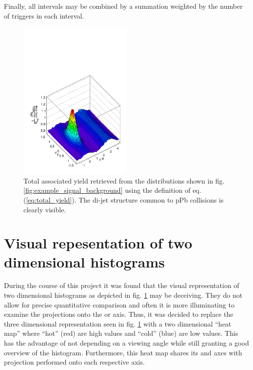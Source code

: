 Finally, all \zvtx intervals may be combined by a summation weighted by the number of triggers in each interval.

\begin{figure}
  \centering
  \includegraphics[width=0.5\textwidth]{figures/example_y.pdf}
  \caption[Total associated yield \Y retrieved from the distributions shown in fig. \ref{fig:example_signal_background} using the definition of eq. (\ref{eq:total_yield}).]{Total associated yield \Y retrieved from the distributions shown in fig. \ref{fig:example_signal_background} using the definition of eq. (\ref{eq:total_yield}). The di-jet structure common to \gls{pPb} collisions is clearly visible.}
  \label{fig:example_y}
\end{figure}

\section{Visual repesentation of two dimensional histograms}
\label{sec:multi_plot_expl}
During the course of this project it was found that the visual representation of two dimensional histograms as depicted in fig. \ref{fig:example_y} may be deceiving. They do not allow for precise quantitative comparison and often it is more illuminating to examine the projections onto the \deta or \dphi axis. Thus, it was decided to replace the three dimensional representation seen in fig. \ref{fig:example_y} with a two dimensional ``heat map'' where ``hot'' (red) are high values and ``cold'' (blue) are low values. This has the advantage of not depending on a viewing angle while still granting a good overview of the histogram. Furthermore, this heat map shares its \deta and \dphi axes with projection performed onto each respective axis.


